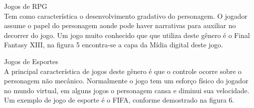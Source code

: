 \begin{alineascomponto}
\item Jogos de RPG\\
Tem como característica o desenvolvimento gradativo do personagem. O jogador assume o papel do personagem aonde pode haver narrativas para auxiliar no decorrer do jogo.
Um jogo muito conhecido que que utiliza deste gênero é o Final Fantasy XIII,  na figura 5 encontra-se a capa da Mídia digital deste jogo. \cite{gen1}
\end{alineascomponto}
\pagebreak
\begin{figure}[h!]
		\centering
	\end{figure}
	
\begin{alineascomponto}
\item Jogos de Esportes\\
A principal característica de jogos deste gênero é que o controle ocorre sobre o personagem não mecânico. Normalmente o jogo tem um esforço físico do jogador no
mundo virtual, em alguns jogos o personagem cansa e diminui sua velocidade. Um exemplo de jogo de esporte é o FIFA, conforme demostrado na figura 6. \cite{gen1}

\end{alineascomponto}
\begin{figure}[h!]
		\centering
	\end{figure}

